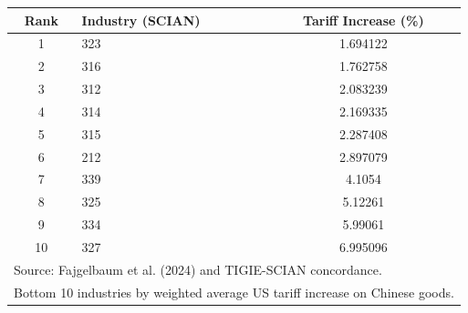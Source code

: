 \begin{tabular}{clc}
\toprule
Rank & Industry (SCIAN) & Tariff Increase (\%) \\
\midrule
1&323&1.694122\\
2&316&1.762758\\
3&312&2.083239\\
4&314&2.169335\\
5&315&2.287408\\
6&212&2.897079\\
7&339&4.1054\\
8&325&5.12261\\
9&334&5.99061\\
10&327&6.995096\\
\bottomrule
\multicolumn{3}{l}{\footnotesize Source: Fajgelbaum et al. (2024) and TIGIE-SCIAN concordance.} \\
\multicolumn{3}{l}{\footnotesize Bottom 10 industries by weighted average US tariff increase on Chinese goods.} \\
\end{tabular}
